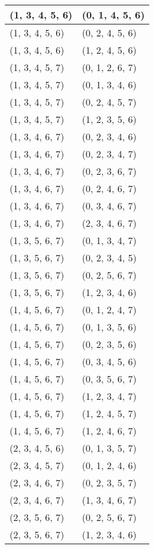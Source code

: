 \begin{footnotesize}
\begin{longtable}[c]{|l|l|}
\\ \hline
(1, 3, 4, 5, 6)
&(0, 1, 4, 5, 6)
\\ \hline
(1, 3, 4, 5, 6)
&(0, 2, 4, 5, 6)
\\ \hline
(1, 3, 4, 5, 6)
&(1, 2, 4, 5, 6)
\\ \hline
(1, 3, 4, 5, 7)
&(0, 1, 2, 6, 7)
\\ \hline
(1, 3, 4, 5, 7)
&(0, 1, 3, 4, 6)
\\ \hline
(1, 3, 4, 5, 7)
&(0, 2, 4, 5, 7)
\\ \hline
(1, 3, 4, 5, 7)
&(1, 2, 3, 5, 6)
\\ \hline
(1, 3, 4, 6, 7)
&(0, 2, 3, 4, 6)
\\ \hline
(1, 3, 4, 6, 7)
&(0, 2, 3, 4, 7)
\\ \hline
(1, 3, 4, 6, 7)
&(0, 2, 3, 6, 7)
\\ \hline
(1, 3, 4, 6, 7)
&(0, 2, 4, 6, 7)
\\ \hline
(1, 3, 4, 6, 7)
&(0, 3, 4, 6, 7)
\\ \hline
(1, 3, 4, 6, 7)
&(2, 3, 4, 6, 7)
\\ \hline
(1, 3, 5, 6, 7)
&(0, 1, 3, 4, 7)
\\ \hline
(1, 3, 5, 6, 7)
&(0, 2, 3, 4, 5)
\\ \hline
(1, 3, 5, 6, 7)
&(0, 2, 5, 6, 7)
\\ \hline
(1, 3, 5, 6, 7)
&(1, 2, 3, 4, 6)
\\ \hline
(1, 4, 5, 6, 7)
&(0, 1, 2, 4, 7)
\\ \hline
(1, 4, 5, 6, 7)
&(0, 1, 3, 5, 6)
\\ \hline
(1, 4, 5, 6, 7)
&(0, 2, 3, 5, 6)
\\ \hline
(1, 4, 5, 6, 7)
&(0, 3, 4, 5, 6)
\\ \hline
(1, 4, 5, 6, 7)
&(0, 3, 5, 6, 7)
\\ \hline
(1, 4, 5, 6, 7)
&(1, 2, 3, 4, 7)
\\ \hline
(1, 4, 5, 6, 7)
&(1, 2, 4, 5, 7)
\\ \hline
(1, 4, 5, 6, 7)
&(1, 2, 4, 6, 7)
\\ \hline
(2, 3, 4, 5, 6)
&(0, 1, 3, 5, 7)
\\ \hline
(2, 3, 4, 5, 7)
&(0, 1, 2, 4, 6)
\\ \hline
(2, 3, 4, 6, 7)
&(0, 2, 3, 5, 7)
\\ \hline
(2, 3, 4, 6, 7)
&(1, 3, 4, 6, 7)
\\ \hline
(2, 3, 5, 6, 7)
&(0, 2, 5, 6, 7)
\\ \hline
(2, 3, 5, 6, 7)
&(1, 2, 3, 4, 6)
\\ \hline

\end{longtable}
\end{footnotesize}
